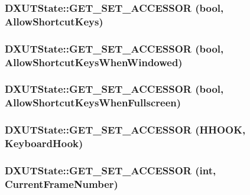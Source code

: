 \label{class_d_x_u_t_state_a88270222bc6d87a610b94309d35a5d4c}
\hypertarget{class_d_x_u_t_state_a06e20d8a4bcc8ebba013abd0a33fea39}{
\subsubsection[{GET\_\-SET\_\-ACCESSOR}]{\setlength{\rightskip}{0pt plus 5cm}DXUTState::GET\_\-SET\_\-ACCESSOR (bool, \/  AllowShortcutKeys)}}
\label{class_d_x_u_t_state_a06e20d8a4bcc8ebba013abd0a33fea39}
\hypertarget{class_d_x_u_t_state_ac133142352b310bb0ec40522f02c34c2}{
\subsubsection[{GET\_\-SET\_\-ACCESSOR}]{\setlength{\rightskip}{0pt plus 5cm}DXUTState::GET\_\-SET\_\-ACCESSOR (bool, \/  AllowShortcutKeysWhenWindowed)}}
\label{class_d_x_u_t_state_ac133142352b310bb0ec40522f02c34c2}
\hypertarget{class_d_x_u_t_state_a240e919faaf9d6d4e7ebeb09305c971a}{
\subsubsection[{GET\_\-SET\_\-ACCESSOR}]{\setlength{\rightskip}{0pt plus 5cm}DXUTState::GET\_\-SET\_\-ACCESSOR (bool, \/  AllowShortcutKeysWhenFullscreen)}}
\label{class_d_x_u_t_state_a240e919faaf9d6d4e7ebeb09305c971a}
\hypertarget{class_d_x_u_t_state_a6db584f64504aa1868d15b3a144d2097}{
\subsubsection[{GET\_\-SET\_\-ACCESSOR}]{\setlength{\rightskip}{0pt plus 5cm}DXUTState::GET\_\-SET\_\-ACCESSOR (HHOOK, \/  KeyboardHook)}}
\label{class_d_x_u_t_state_a6db584f64504aa1868d15b3a144d2097}
\hypertarget{class_d_x_u_t_state_acecf3e26898c43cf90661b119dd6aa63}{
\subsubsection[{GET\_\-SET\_\-ACCESSOR}]{\setlength{\rightskip}{0pt plus 5cm}DXUTState::GET\_\-SET\_\-ACCESSOR ({\bf int}, \/  CurrentFrameNumber)}}
